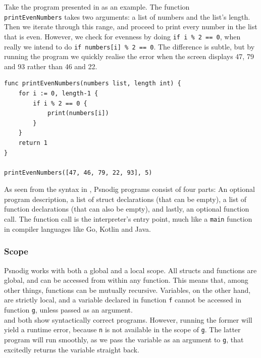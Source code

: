 Take the program presented in  as an example. The function \\ \texttt{printEvenNumbers} takes two arguments: a list of numbers and the list's length. Then we iterate through this range, and proceed to print every number in the list that is even. However, we check for evenness by doing \texttt{if i \% 2 == 0}, when really we intend to do \texttt{if numbers[i] \% 2 == 0}. The difference is subtle, but by running the program we quickly realise the error when the screen displays 47, 79 and 93 rather than 46 and 22. \\

\begin{lstlisting}[caption={A syntactically correct Gourmet program with a subtle logical error.}, captionpos=b, label={A syntactically correct program with a subtle logical error.}]
func printEvenNumbers(numbers list, length int) {
    for i := 0, length-1 {
        if i % 2 == 0 {
            print(numbers[i])
        }
    }
    return 1
}

printEvenNumbers([47, 46, 79, 22, 93], 5)
\end{lstlisting}

As seen from the syntax in , Psnodig programs consist of four parts: An optional program description, a list of struct declarations (that can be empty), a list of function declarations (that can also be empty), and lastly, an optional function call. The function call is the interpreter's entry point, much like a \texttt{main} function in compiler languages like Go, Kotlin and Java.

\subsubsection{Scope}

Psnodig works with both a global and a local scope. All structs and functions are global, and can be accessed from within any function. This means that, among other things, functions can be mutually recursive. Variables, on the other hand, are strictly local, and a variable declared in function \texttt{f} cannot be accessed in function \texttt{g}, unless passed as an argument. \\

 and  both show syntactically correct programs. However, running the former will yield a runtime error, because \texttt{n} is not available in the scope of \texttt{g}. The latter program will run smoothly, as we pass the variable as an argument to \texttt{g}, that excitedly returns the variable straight back. \\

